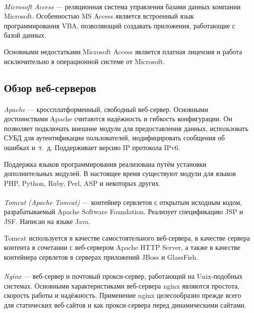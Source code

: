 \paragraph{}
\textit{Microsoft Access} --- реляционная система управления базами данных компании Microsoft.
Особенностью MS Access является встроенный язык программирования VBA, позволяющий создавать
приложения, работающие с базой данных.

Основными недостатками Microsoft Access является платная лицензия и работа исключительно в
операционной системе от Microsoft.

\subsection{Обзор веб-серверов}
\label{sub:choice_server}

\paragraph{}
\textit{Apache} --- кроссплатформенный, свободный веб-сервер. Основными достоинствами
Apache считаются надёжность и гибкость конфигурации. Он позволяет подключать
внешние модули для предоставления данных, использовать СУБД для аутентификации пользователей,
модифицировать сообщения об ошибках и~т.~д. Поддерживает версию IP протокола IPv6.

Поддержка языков программирования реализована путём установки дополнительных модулей.
В настоящее время существуют модули для языков PHP, Python, Ruby, Perl, ASP и некоторых других.

\paragraph{}
\textit{Tomcat (Apache Tomcat)} --- контейнер сервлетов с открытым исходным кодом,
разрабатываемый Apache Software Foundation. Реализует спецификацию JSP и JSF. Написан
на языке Java.

Tomcat используется в качестве самостоятельного веб-сервера, в качестве сервера контента
в сочетании с веб-сервером Apache HTTP Server, а также в качестве контейнера сервлетов
в серверах приложений JBoss и GlassFish.

\paragraph{}
\textit{Nginx} --- веб-сервер и почтовый прокси-сервер, работающий на Unix-подобных системах.
Основными характеристиками веб-сервера nginx являются простота, скорость работы и надёжность.
Применение nginx целесообразно прежде всего для статических веб-сайтов и как прокси-сервера перед
динамическими сайтами.


